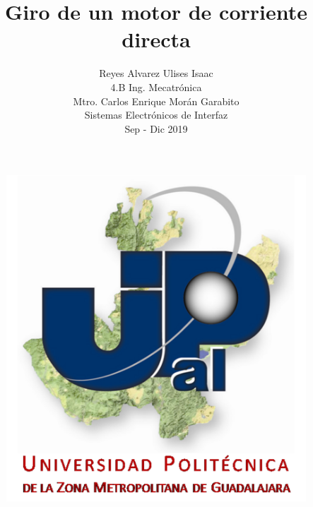 \documentclass[12pt,a4paper]{article}
\author{Reyes Alvarez Ulises Isaac\\4.B   Ing. Mecatrónica\\Mtro. Carlos Enrique Morán Garabito\\Sistemas Electrónicos de Interfaz\\Sep - Dic 2019}
\title{Giro de un motor de corriente directa}
\begin{document}
\maketitle
\begin{figure}[hbtp]
\centering
\includegraphics[scale=2]{Circuitos/Universidad.png}
\end{figure}

\newpage
\end{document}
